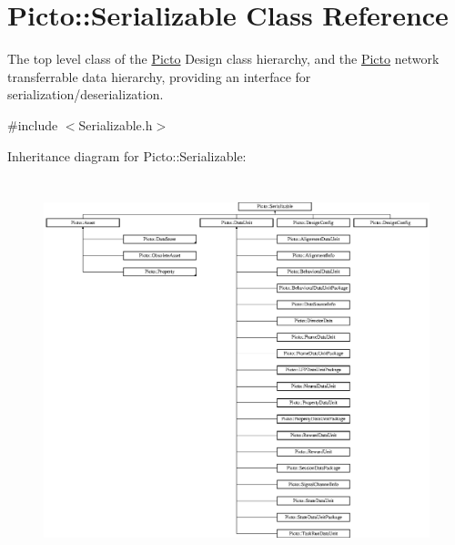 \hypertarget{class_picto_1_1_serializable}{\section{Picto\-:\-:Serializable Class Reference}
\label{class_picto_1_1_serializable}
}


The top level class of the \hyperlink{namespace_picto}{Picto} Design class hierarchy, and the \hyperlink{namespace_picto}{Picto} network transferrable data hierarchy, providing an interface for serialization/deserialization.  




{\ttfamily \#include $<$Serializable.\-h$>$}

Inheritance diagram for Picto\-:\-:Serializable\-:\begin{figure}[H]
\begin{center}
\leavevmode
\includegraphics[height=11.146919cm]{class_picto_1_1_serializable}
\end{center}
\end{figure}
